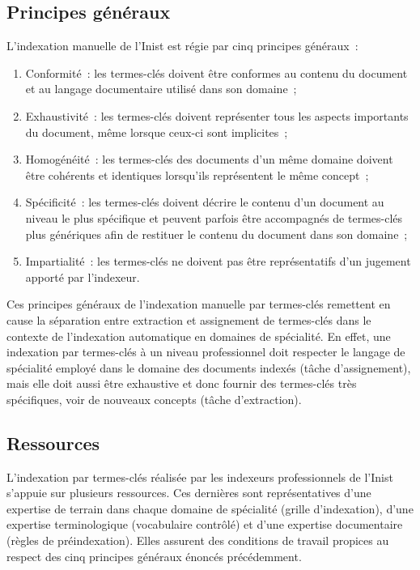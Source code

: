   \subsection{Principes généraux}
  \label{subsec:main-domain_specific_keyphrase_annotation-manual_keyphrase_annotation-principles}
    L'indexation manuelle de l'Inist est régie par cinq principes généraux~:
    \begin{enumerate}
      \item{Conformité~: les termes-clés doivent être conformes au contenu du
            document et au langage documentaire utilisé dans son domaine~;}
      \item{Exhaustivité~: les termes-clés doivent représenter tous les
            aspects importants du document, même lorsque ceux-ci sont
            implicites~;}
      \item{Homogénéité~: les termes-clés des documents d'un même domaine
            doivent être cohérents et identiques lorsqu'ils représentent le
            même concept~;}
      \item{Spécificité~: les termes-clés doivent décrire le contenu d'un
            document au niveau le plus spécifique et peuvent
            parfois être accompagnés de termes-clés plus génériques afin de
            restituer le contenu du document dans son domaine~;}
      \item{Impartialité~: les termes-clés ne doivent pas être représentatifs
            d'un jugement apporté par l'indexeur.}
    \end{enumerate}

    Ces principes généraux de l'indexation manuelle par termes-clés remettent
    en cause la séparation entre extraction et assignement de termes-clés dans
    le contexte de l'indexation automatique en domaines de spécialité. En
    effet, une indexation par termes-clés à un niveau professionnel doit
    respecter le langage de spécialité employé dans le domaine des documents
    indexés (tâche d'assignement), mais elle doit aussi être exhaustive et
    donc fournir des termes-clés très spécifiques, voir de nouveaux concepts
    (tâche d'extraction).

  \subsection{Ressources}
  \label{subsec:main-domain_specific_keyphrase_annotation-manual_keyphrase_annotation-resources}
    L'indexation par termes-clés réalisée par les indexeurs professionnels de
    l'Inist s'appuie sur plusieurs ressources. Ces dernières sont
    représentatives d'une expertise de terrain dans chaque domaine de
    spécialité (grille d'indexation), d'une expertise terminologique
    (vocabulaire contrôlé) et d'une expertise documentaire (règles de
    préindexation). Elles assurent des conditions de travail propices
    au respect des cinq principes généraux énoncés précédemment.

